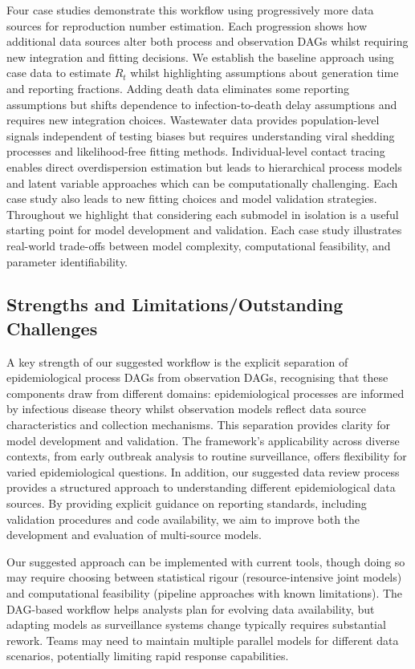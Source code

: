 \documentclass{article}
\begin{document}
Four case studies demonstrate this workflow using progressively more data sources for reproduction number estimation.
Each progression shows how additional data sources alter both process and observation DAGs whilst requiring new integration and fitting decisions.
We establish the baseline approach using case data to estimate $R_t$ whilst highlighting assumptions about generation time and reporting fractions.
Adding death data eliminates some reporting assumptions but shifts dependence to infection-to-death delay assumptions and requires new integration choices.
Wastewater data provides population-level signals independent of testing biases but requires understanding viral shedding processes and likelihood-free fitting methods.
Individual-level contact tracing enables direct overdispersion estimation but leads to hierarchical process models and latent variable approaches which can be computationally challenging.
Each case study also leads to new fitting choices and model validation strategies.
Throughout we highlight that considering each submodel in isolation is a useful starting point for model development and validation.
Each case study illustrates real-world trade-offs between model complexity, computational feasibility, and parameter identifiability.

\subsection{Strengths and Limitations/Outstanding Challenges}

A key strength of our suggested workflow is the explicit separation of epidemiological process DAGs from observation DAGs, recognising that these components draw from different domains: epidemiological processes are informed by infectious disease theory whilst observation models reflect data source characteristics and collection mechanisms.
This separation provides clarity for model development and validation.
The framework's applicability across diverse contexts, from early outbreak analysis to routine surveillance, offers flexibility for varied epidemiological questions.
In addition, our suggested data review process provides a structured approach to understanding different epidemiological data sources.
By providing explicit guidance on reporting standards, including validation procedures and code availability, we aim to improve both the development and evaluation of multi-source models.

Our suggested approach can be implemented with current tools, though doing so may require choosing between statistical rigour (resource-intensive joint models) and computational feasibility (pipeline approaches with known limitations).
The DAG-based workflow helps analysts plan for evolving data availability, but adapting models as surveillance systems change typically requires substantial rework.
Teams may need to maintain multiple parallel models for different data scenarios, potentially limiting rapid response capabilities.
\end{document}
